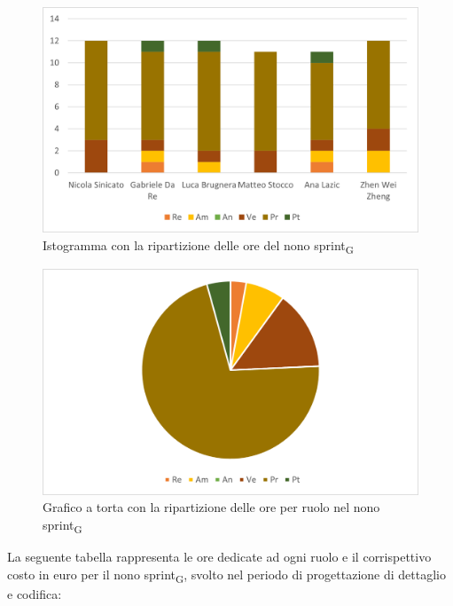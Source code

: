 \begin{figure}[H]
    \centering
    \includegraphics[scale=0.6]{img/grafi preventivo/istogrammi/codifica/sprint9.png}
    \caption{Istogramma con la ripartizione delle ore del nono sprint\textsubscript{G}}
\end{figure}
\begin{figure}[H]
    \centering
    \includegraphics[scale=0.6]{img/grafi preventivo/torta/codifica/sprint9.png}
    \caption{Grafico a torta con la ripartizione delle ore per ruolo nel nono sprint\textsubscript{G}}
\end{figure}
La seguente tabella rappresenta le ore dedicate ad ogni ruolo e il corrispettivo costo in euro per il nono sprint\textsubscript{G}, svolto nel periodo di progettazione di dettaglio e codifica: 

